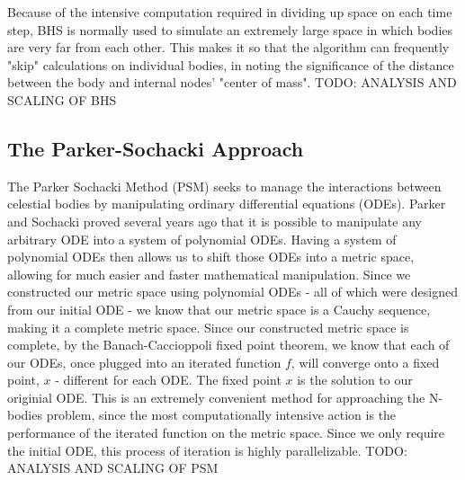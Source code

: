 \documentclass[11pt]{article}
\begin{document}
\newline \newline
Because of the intensive computation required in dividing up space on each time step, BHS is normally used to simulate an extremely large space in which bodies are very far from each other. This makes it so that the algorithm can frequently "skip" calculations on individual bodies, in noting the significance of the distance between the body and internal nodes' "center of mass".
\newline \newline
TODO: ANALYSIS AND SCALING OF BHS
\begin{center}
\section*{The Parker-Sochacki Approach}
\end{center}
The Parker Sochacki Method (PSM) seeks to manage the interactions between celestial bodies by manipulating ordinary differential equations (ODEs). Parker and Sochacki proved several years ago that it is possible to manipulate any arbitrary ODE into a system of polynomial ODEs. Having a system of polynomial ODEs then allows us to shift those ODEs into a metric space, allowing for much easier and faster mathematical manipulation. 
\newline \newline
Since we constructed our metric space using polynomial ODEs - all of which were designed from our initial ODE - we know that our metric space is a Cauchy sequence, making it a complete metric space. Since our constructed metric space is complete, by the Banach-Caccioppoli fixed point theorem, we know that each of our ODEs, once plugged into an iterated function $f$, will converge onto a fixed point, $x$ - different for each ODE. The fixed point $x$ is the solution to our originial ODE. 
\newline \newline 
This is an extremely convenient method for approaching the N-bodies problem, since the most computationally intensive action is the performance of the iterated function on the metric space. Since we only require the initial ODE, this process of iteration is highly parallelizable.
\newline \newline
TODO: ANALYSIS AND SCALING OF PSM
\end{document}
